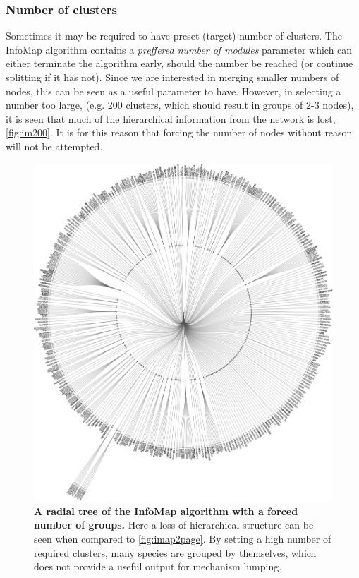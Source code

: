  \subsubsection{Number of clusters}
Sometimes it may be required to have preset (target) number of clusters. The InfoMap algorithm contains a \emph{preffered number of modules} parameter which can either terminate the algorithm early, should the number be reached (or continue splitting if it has not). Since we are interested in merging smaller numbers of nodes, this can be seen as a useful parameter to have. However, in selecting a number too large, (e.g. 200 clusters, which should result in groups of 2-3 nodes), it is seen that much of the hierarchical information from the network is lost, \autoref{fig:im200}. It is for this reason that forcing the number of nodes without reason will not be attempted.


  \begin{figure}[H]
    \centering
    \includegraphics[width=.8\textwidth]{fig/manygroups.pdf}
    \caption{\textbf{A radial tree of the InfoMap algorithm with a forced number of groups.} Here a loss of hierarchical structure can be seen when compared to \autoref{fig:imap2page}. By setting a high number of required clusters, many species are grouped by themselves, which does not provide a useful output for mechanism lumping. }
        \label{fig:im200}
  \end{figure}




















%
